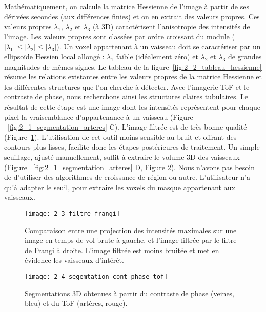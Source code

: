 Mathématiquement, on calcule la matrice Hessienne de l’image à partir de ses dérivées secondes (aux différences finies) et on en extrait des valeurs propres. Ces valeurs propres $\lambda_1$, $\lambda_2$ et $\lambda_3$ (à 3D) caractérisent l’anisotropie des intensités de l’image. Les valeurs propres sont classées par ordre croissant du module ($|\lambda_1|\leqslant|\lambda_2|\leqslant|\lambda_3|$). Un voxel appartenant à un vaisseau doit se caractériser par un ellipsoïde Hessien local allongé : $\lambda_1$ faible (idéalement zéro) et $\lambda_2$ et $\lambda_3$ de grandes magnitudes de mêmes signes. Le tableau de la figure~\ref{fig:2_2_tableau_hessienne} résume les relations existantes entre les valeurs propres de la matrice Hessienne et les différentes structures que l’on cherche à détecter. Avec l’imagerie ToF et le contraste de phase, nous recherchons ainsi les structures claires tubulaires. Le résultat de cette étape est une image dont les intensités représentent pour chaque pixel la vraisemblance d’appartenance à un vaisseau (Figure ~\ref{fig:2_1_segmentation_arteres} C). L’image filtrée est de très bonne qualité (Figure~\ref{fig:2_3_filtre_frangi}). L’utilisation de cet outil moins sensible au bruit et offrant des contours plus lisses, facilite donc les étapes postérieures de traitement. Un simple seuillage, ajusté manuellement, suffit à extraire le volume 3D des vaisseaux (Figure ~\ref{fig:2_1_segmentation_arteres} D, Figure \ref{fig:2_4_segemtation_cont_phase_tof}). Nous n’avons pas besoin de d’utiliser des algorithmes de croissance de région ou autre. L’utilisateur n’a qu’à adapter le seuil, pour extraire les voxels du masque appartenant aux vaisseaux. 
\begin{figure}[!t]
\centering
\texttt{[image: 2\_3\_filtre\_frangi]}
\caption{Comparaison entre une projection des intensités maximales sur une image en temps de vol brute à gauche, et l'image filtrée par le filtre de Frangi à droite. L'image filtrée est moins bruitée et met en évidence les vaisseaux d'intérêt.}
\label{fig:2_3_filtre_frangi}	
\end{figure}	

\begin{figure}[!t]
\centering
\texttt{[image: 2\_4\_segemtation\_cont\_phase\_tof]}
\caption{Segmentations 3D obtenues à partir du contraste de phase (veines, bleu) et du ToF (artères, rouge).}
\label{fig:2_4_segemtation_cont_phase_tof}	
\end{figure}	

